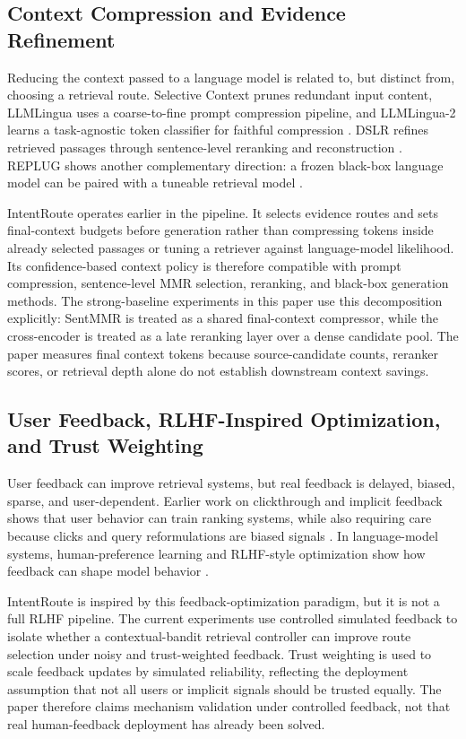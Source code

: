 \subsection{Context Compression and Evidence Refinement}
\label{sec:03-related-work:context-compression-and-evidence-refinement}

Reducing the context passed to a language model is related to, but distinct from, choosing a retrieval route. Selective Context prunes redundant input content, LLMLingua uses a coarse-to-fine prompt compression pipeline, and LLMLingua-2 learns a task-agnostic token classifier for faithful compression \citep{li2023selectivecontext,jiang2023llmlingua,pan2024llmlingua2}. DSLR refines retrieved passages through sentence-level reranking and reconstruction \citep{hwang2024dslr}. REPLUG shows another complementary direction: a frozen black-box language model can be paired with a tuneable retrieval model \citep{shi2024replug}.

IntentRoute operates earlier in the pipeline. It selects evidence routes and sets final-context budgets before generation rather than compressing tokens inside already selected passages or tuning a retriever against language-model likelihood. Its confidence-based context policy is therefore compatible with prompt compression, sentence-level MMR selection, reranking, and black-box generation methods. The strong-baseline experiments in this paper use this decomposition explicitly: SentMMR is treated as a shared final-context compressor, while the cross-encoder is treated as a late reranking layer over a dense candidate pool. The paper measures final context tokens because source-candidate counts, reranker scores, or retrieval depth alone do not establish downstream context savings.

\subsection{User Feedback, RLHF-Inspired Optimization, and Trust Weighting}
\label{sec:03-related-work:user-feedback-rlhf-inspired-optimization-and-trust-weighting}

User feedback can improve retrieval systems, but real feedback is delayed, biased, sparse, and user-dependent. Earlier work on clickthrough and implicit feedback shows that user behavior can train ranking systems, while also requiring care because clicks and query reformulations are biased signals \citep{joachims2002clickthrough,radlinski2005querychains}. In language-model systems, human-preference learning and RLHF-style optimization show how feedback can shape model behavior \citep{christiano2017preferences,ouyang2022instructgpt}.

IntentRoute is inspired by this feedback-optimization paradigm, but it is not a full RLHF pipeline. The current experiments use controlled simulated feedback to isolate whether a contextual-bandit retrieval controller can improve route selection under noisy and trust-weighted feedback. Trust weighting is used to scale feedback updates by simulated reliability, reflecting the deployment assumption that not all users or implicit signals should be trusted equally. The paper therefore claims mechanism validation under controlled feedback, not that real human-feedback deployment has already been solved.
